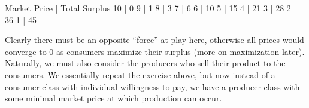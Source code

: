 \documentclass[letterpaper,10pt,english]{jupyterBook}
\begin{document}
\begin{sphinxVerbatim}[commandchars=\\\{\}]
     
   
                      \PYG{p}{[}    \PYG{p}{]} 
\end{sphinxVerbatim}

\begin{sphinxVerbatim}[commandchars=\\\{\}]
Market Price | Total Surplus
10           | 0
9            | 1
8            | 3
7            | 6
6            | 10
5            | 15
4            | 21
3            | 28
2            | 36
1            | 45
\end{sphinxVerbatim}

\sphinxAtStartPar
Clearly there must be an opposite “force” at play here, otherwise all prices would converge to 0 as consumers maximize their surplus (more on maximization later). Naturally, we must also consider the producers who sell their product to the consumers. We essentially repeat the exercise above, but now instead of a consumer class with individual willingness to pay, we have a producer class with some minimal market price at which production can occur.
\end{document}
